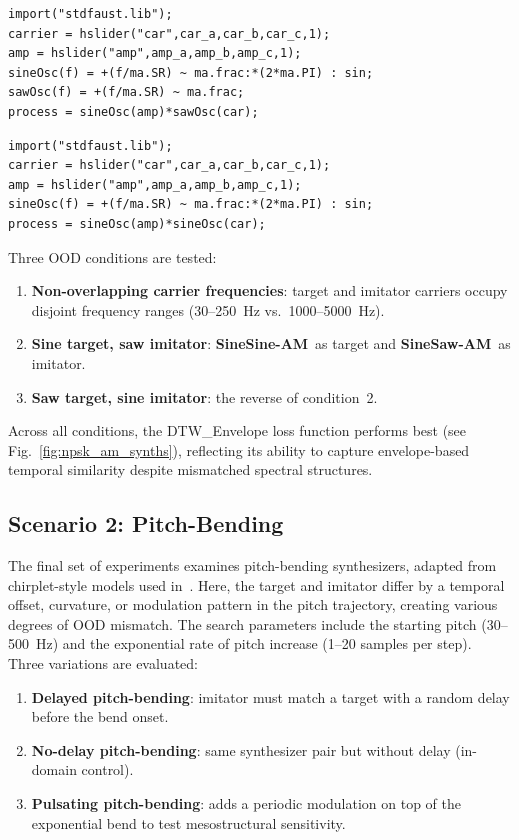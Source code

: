 \documentclass[runningheads]{llncs}
\newcommand{\FMMod}{\textbf{SineSaw-AM}\xspace}
\newcommand{\FMModvtwo}{\textbf{SineSine-AM}\xspace}
\begin{document}
\begin{lstlisting}[caption={\FMMod}, label={lst:program3},language=Faust,float,floatplacement=!H,xleftmargin=1em,xrightmargin=0.5em,firstnumber=0,aboveskip=0em, belowskip=-1em]
import("stdfaust.lib");
carrier = hslider("car",car_a,car_b,car_c,1);
amp = hslider("amp",amp_a,amp_b,amp_c,1);
sineOsc(f) = +(f/ma.SR) ~ ma.frac:*(2*ma.PI) : sin;
sawOsc(f) = +(f/ma.SR) ~ ma.frac;
process = sineOsc(amp)*sawOsc(car);
\end{lstlisting}

\begin{lstlisting}[caption={\FMModvtwo}, label={lst:program3_v2},language=Faust,float,floatplacement=!H,xleftmargin=1em,xrightmargin=0.5em,firstnumber=0,aboveskip=0em, belowskip=-1em]
import("stdfaust.lib");
carrier = hslider("car",car_a,car_b,car_c,1);
amp = hslider("amp",amp_a,amp_b,amp_c,1);
sineOsc(f) = +(f/ma.SR) ~ ma.frac:*(2*ma.PI) : sin;
process = sineOsc(amp)*sineOsc(car);
\end{lstlisting}

Three OOD conditions are tested:
\begin{enumerate}
  \item \textbf{Non-overlapping carrier frequencies}: target and imitator carriers occupy disjoint frequency ranges (30–250~Hz vs.~1000–5000~Hz).  
  \item \textbf{Sine target, saw imitator}: \FMModvtwo\ as target and \FMMod\ as imitator.  
  \item \textbf{Saw target, sine imitator}: the reverse of condition~2.  
\end{enumerate}

Across all conditions, the DTW\_Envelope loss function performs best (see Fig.~\ref{fig:npsk_am_synths}), reflecting its ability to capture envelope-based temporal similarity despite mismatched spectral structures.



\subsection{Scenario 2: Pitch-Bending}
The final set of experiments examines pitch-bending synthesizers, adapted from chirplet-style models used in~\cite{vahidi2023mesostructures}.  
Here, the target and imitator differ by a temporal offset, curvature, or modulation pattern in the pitch trajectory, creating various degrees of OOD mismatch.  
The search parameters include the starting pitch (30–500~Hz) and the exponential rate of pitch increase (1–20 samples per step).  
Three variations are evaluated:
\begin{enumerate}
  \item \textbf{Delayed pitch-bending}: imitator must match a target with a random delay before the bend onset.  
  \item \textbf{No-delay pitch-bending}: same synthesizer pair but without delay (in-domain control).  
  \item \textbf{Pulsating pitch-bending}: adds a periodic modulation on top of the exponential bend to test mesostructural sensitivity.
\end{enumerate}
\end{document}
